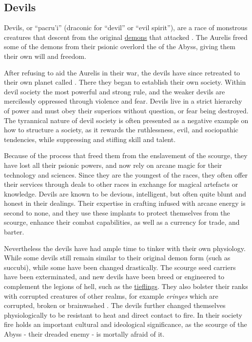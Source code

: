 \subsection{Devils}
\label{sec:Devils}

Devils, or ``pacru'i'' (draconic for ``devil'' or ``evil spirit''), are a
race of monstrous creatures that descent from the original
\hyperref[sec:Demons]{demons} that attacked . The Aurelis
freed some of the demons from their psionic overlord the 
of the Abyss, giving them their own will and freedom.

After refusing to aid the Aurelis in their war, the devils have since
retreated to their own planet called . There they began to
establish their own society. Within devil society the most powerful and strong
rule, and the weaker devils are mercilessly oppressed through violence and
fear. Devils live in a strict hierarchy of power and must obey their superiors
without question, or fear being destroyed. The tyrannical nature of devil
society is often presented as a negative example on how to structure a
society, as it rewards the ruthlessness, evil, and sociopathic tendencies,
while suppressing and stifling skill and talent.

Because of the process that freed them from the enslavement of the scourge,
they have lost all their psionic powers, and now rely on arcane magic for
their technology and sciences. Since they are the youngest of the races, they
often offer their services through deals to other races in exchange for
magical artefacts or knowledge. Devils are known to be devious, intelligent,
but often quite blunt and honest in their dealings. Their expertise in crafting
 infused with arcane energy is second to none, and they
use these implants to protect themselves from the scourge, enhance their
combat capabilities, as well as a currency for trade, and barter.

Nevertheless the devils have had ample time to tinker with their own
physiology. While some devils still remain similar to their original demon
form (such as succubi), while some have been changed drastically. The scourge
seed carriers have been exterminated, and new devils have been breed or
engineered to complement the legions of hell, such as the
\hyperref[sec:Tieflings]{tieflings}. They also bolster their ranks with
corrupted creatures of other realms, for example \emph{erinyes} which are
corrupted, broken or brainwashed . The devils further
changed themselves physiologically to be resistant to heat and direct contact
to fire. In their society fire holds an important cultural and ideological
significance, as the scourge of the Abyss - their dreaded enemy - is mortally
afraid of it.

